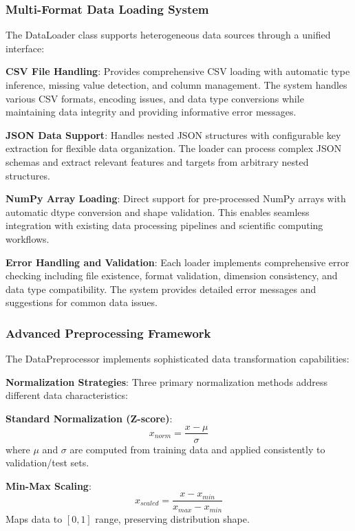 \documentclass[11pt,a4paper]{report}
\begin{document}
\subsubsection{Multi-Format Data Loading System}

The DataLoader class supports heterogeneous data sources through a unified interface:

\textbf{CSV File Handling}: Provides comprehensive CSV loading with automatic type inference, missing value detection, and column management. The system handles various CSV formats, encoding issues, and data type conversions while maintaining data integrity and providing informative error messages.

\textbf{JSON Data Support}: Handles nested JSON structures with configurable key extraction for flexible data organization. The loader can process complex JSON schemas and extract relevant features and targets from arbitrary nested structures.

\textbf{NumPy Array Loading}: Direct support for pre-processed NumPy arrays with automatic dtype conversion and shape validation. This enables seamless integration with existing data processing pipelines and scientific computing workflows.

\textbf{Error Handling and Validation}: Each loader implements comprehensive error checking including file existence, format validation, dimension consistency, and data type compatibility. The system provides detailed error messages and suggestions for common data issues.

\subsubsection{Advanced Preprocessing Framework}

The DataPreprocessor implements sophisticated data transformation capabilities:

\textbf{Normalization Strategies}: Three primary normalization methods address different data characteristics:

\textbf{Standard Normalization (Z-score)}:
\begin{equation}
x_{norm} = \frac{x - \mu}{\sigma}
\end{equation}
where $\mu$ and $\sigma$ are computed from training data and applied consistently to validation/test sets.

\textbf{Min-Max Scaling}:
\begin{equation}
x_{scaled} = \frac{x - x_{min}}{x_{max} - x_{min}}
\end{equation}
Maps data to $[0, 1]$ range, preserving distribution shape.
\end{document}
